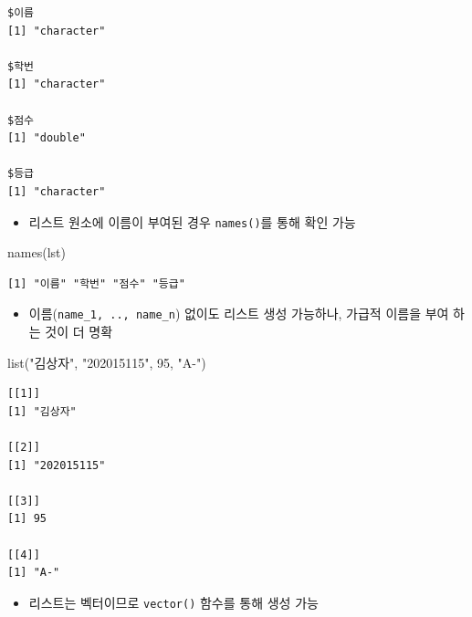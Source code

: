 \documentclass[
  11pt,
]{krantz}
\newenvironment{Shaded}{\begin{snugshade}}{\end{snugshade}}
\newcommand{\DecValTok}[1]{\textcolor[rgb]{0.06,0.06,0.06}{#1}}
\newcommand{\FunctionTok}[1]{\textcolor[rgb]{0,0,0}{#1}}
\newcommand{\NormalTok}[1]{#1}
\newcommand{\StringTok}[1]{\textcolor[rgb]{0.5,0.5,0.5}{#1}}
\providecommand{\tightlist}{%
  \setlength{\itemsep}{0pt}\setlength{\parskip}{0pt}}
\begin{document}
\begin{verbatim}
$이름
[1] "character"

$학번
[1] "character"

$점수
[1] "double"

$등급
[1] "character"
\end{verbatim}

\normalsize

\begin{itemize}
\tightlist
\item
  리스트 원소에 이름이 부여된 경우 \texttt{names()}를 통해 확인 가능
\end{itemize}

\footnotesize

\begin{Shaded}
\begin{Highlighting}[]
\FunctionTok{names}\NormalTok{(lst)}
\end{Highlighting}
\end{Shaded}

\begin{verbatim}
[1] "이름" "학번" "점수" "등급"
\end{verbatim}

\normalsize

\begin{itemize}
\tightlist
\item
  이름(\texttt{name\_1,\ ..,\ name\_n}) 없이도 리스트 생성 가능하나, 가급적 이름을 부여 하는 것이 더 명확
\end{itemize}

\footnotesize

\begin{Shaded}
\begin{Highlighting}[]
\FunctionTok{list}\NormalTok{(}\StringTok{"김상자"}\NormalTok{, }\StringTok{"202015115"}\NormalTok{, }\DecValTok{95}\NormalTok{, }\StringTok{"A{-}"}\NormalTok{)}
\end{Highlighting}
\end{Shaded}

\begin{verbatim}
[[1]]
[1] "김상자"

[[2]]
[1] "202015115"

[[3]]
[1] 95

[[4]]
[1] "A-"
\end{verbatim}

\normalsize

\begin{itemize}
\tightlist
\item
  리스트는 벡터이므로 \texttt{vector()} 함수를 통해 생성 가능
\end{itemize}
\end{document}
